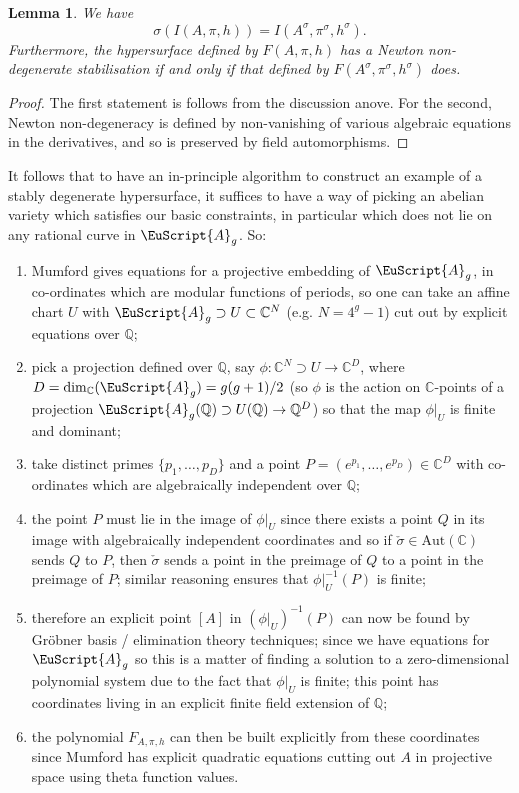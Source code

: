 \documentclass[11pt]{amsart}
\newtheorem{lemma}[thm]{Lemma}
\newcommand{\scrA}{\EuScript{A}}
\newcommand{\bQ}{\mathbb{Q}}
\newcommand{\bC}{\mathbb{C}}
\newcommand{\Aut}{\mathrm{Aut}}
\numberwithin{equation}{section}
\begin{document}
\begin{lemma} \label{lemmastableautomorphism}
	We have
	\begin{equation}
		\sigma(I(A,\pi,h)) = I(A^{\sigma},\pi^{\sigma},h^{\sigma}).
	\end{equation}
	Furthermore, the hypersurface defined by $F(A,\pi,h)$ has a Newton non-degenerate stabilisation if and only if that defined by $F(A^{\sigma},\pi^{\sigma},h^{\sigma})$ does.
\end{lemma}

\begin{proof}
	The first statement is follows from the discussion anove. For the second, Newton non-degeneracy is defined by non-vanishing of various algebraic equations in the derivatives, and so is preserved by field automorphisms.
\end{proof}

It follows that to have an in-principle algorithm to construct an example of a stably degenerate hypersurface, it suffices to have a way of picking an abelian variety which satisfies our basic constraints, in particular which does not lie on any rational curve in $\scrA_g$. So:

\begin{enumerate}
	\item Mumford \cite{Mumford2} gives equations for a projective embedding of $\scrA_g$, in co-ordinates which are modular functions of periods, so one can take an affine chart $U$ with $\scrA_g  \supset U \subset \bC^N$ (e.g. $N = 4^g-1$) cut out by explicit equations over $\bQ$;
	\item pick a projection defined over $\bQ$, say $\phi:  \bC^N \supset U \to \bC^D$, where $D = \dim_{\bC}(\scrA_g) = g(g+1)/2$ (so $\phi$ is the action on $\bC$-points of a projection $\scrA_g(\bQ) \supset U(\bQ) \to \bQ^D$) so that the map $\phi|_U$ is finite and dominant;
	\item  take distinct primes $\{p_1,\ldots,p_D\}$ and a point $P = (e^{p_1},\ldots, e^{p_D}) \in \bC^D$ with co-ordinates which are algebraically independent over $\bQ$;
	\item the point $P$ must lie in the image of $\phi|_U$ since there exists a point $Q$ in its image with algebraically independent coordinates and so if $\check{\sigma} \in \Aut(\bC)$ sends $Q$ to $P$, then $\check{\sigma}$ sends a point in the preimage of $Q$ to a point in the preimage of $P$; similar reasoning ensures that $\phi|_U^{-1}(P)$ is finite;
	\item therefore an explicit point $[A]$ in $(\phi|_U)^{-1}(P)$ can now be found by Gr\"obner basis / elimination theory techniques; since we have equations for $\scrA_g$ so this is a matter of finding a solution to a zero-dimensional polynomial system due to the fact that $\phi|_U$ is finite; this point has coordinates living in an explicit finite field extension of $\bQ$;
	\item the polynomial $F_{A,\pi,h}$ can then be built explicitly from these coordinates since Mumford \cite{Mumford2} has explicit quadratic equations cutting out $A$ in projective space using theta function values.
\end{enumerate}
\end{document}
